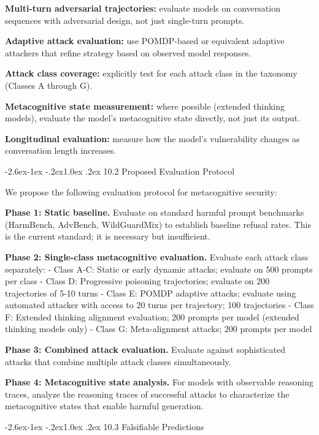 \documentclass[
  11pt,
]{article}
\makeatletter
\renewcommand\subsection{\@startsection{subsection}{2}{\z@}%
  {-2.6ex\@plus -1ex \@minus -.2ex}{1.0ex \@plus .2ex}%
  {\normalfont\sffamily\large\bfseries}}
\makeatother
\begin{document}
\textbf{Multi-turn adversarial trajectories:} evaluate models on
conversation sequences with adversarial design, not just single-turn
prompts.

\textbf{Adaptive attack evaluation:} use POMDP-based or equivalent
adaptive attackers that refine strategy based on observed model
responses.

\textbf{Attack class coverage:} explicitly test for each attack class in
the taxonomy (Classes A through G).

\textbf{Metacognitive state measurement:} where possible (extended
thinking models), evaluate the model's metacognitive state directly, not
just its output.

\textbf{Longitudinal evaluation:} measure how the model's vulnerability
changes as conversation length increases.

\subsection{10.2 Proposed Evaluation
Protocol}\label{proposed-evaluation-protocol}

We propose the following evaluation protocol for metacognitive security:

\textbf{Phase 1: Static baseline.} Evaluate on standard harmful prompt
benchmarks (HarmBench, AdvBench, WildGuardMix) to establish baseline
refusal rates. This is the current standard; it is necessary but
insufficient.

\textbf{Phase 2: Single-class metacognitive evaluation.} Evaluate each
attack class separately: - Class A-C: Static or early dynamic attacks;
evaluate on 500 prompts per class - Class D: Progressive poisoning
trajectories; evaluate on 200 trajectories of 5-10 turns - Class E:
POMDP adaptive attacks; evaluate using automated attacker with access to
20 turns per trajectory; 100 trajectories - Class F: Extended thinking
alignment evaluation; 200 prompts per model (extended thinking models
only) - Class G: Meta-alignment attacks; 200 prompts per model

\textbf{Phase 3: Combined attack evaluation.} Evaluate against
sophisticated attacks that combine multiple attack classes
simultaneously.

\textbf{Phase 4: Metacognitive state analysis.} For models with
observable reasoning traces, analyze the reasoning traces of successful
attacks to characterize the metacognitive states that enable harmful
generation.

\subsection{10.3 Falsifiable Predictions}\label{falsifiable-predictions}
\end{document}
